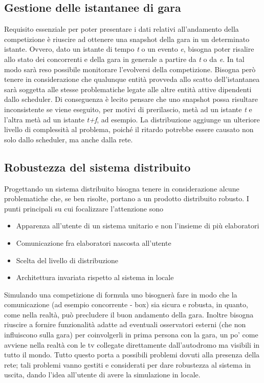 \subsection{Gestione delle istantanee di gara}
Requisito essenziale per poter presentare i dati relativi all'andamento della
competizione è riuscire ad ottenere una
snapshot della gara in un determinato istante. Ovvero, dato un istante di tempo
\emph{t} o un evento \emph{e}, bisogna
poter risalire allo stato dei concorrenti e della gara in generale a partire da \emph{t} o da \emph{e}. 
In tal modo sarà reso possibile
monitorare l'evolversi della competizione. Bisogna però tenere in considerazione
che qualunque entità provveda allo scatto
dell'istantanea sarà soggetta alle stesse problematiche legate alle altre entità
attive dipendenti dallo scheduler. 
Di conseguenza è lecito pensare che uno snapshot possa risultare inconsistente
se viene eseguito, per motivi di 
prerilascio, metà ad un istante
\emph{t} e l'altra metà ad un istante \emph{t+f}, ad esempio. La distribuzione
aggiunge un ulteriore livello di complessità
al problema, poiché il ritardo potrebbe essere causato non solo dallo scheduler,
ma anche dalla rete.
\subsection{Robustezza del sistema distribuito }
Progettando un sistema distribuito bisogna tenere in considerazione alcune
problematiche che, se ben risolte, portano a un prodotto distribuito robusto.
I punti principali su cui focalizzare l'attenzione sono
\begin{itemize}
\item Apparenza all'utente di un sistema unitario e non l'insieme di pi\`{u}
elaboratori
\item Comunicazione fra elaboratori nascosta all'utente
\item Scelta del livello di distribuzione
\item Architettura invariata rispetto al sistema in locale
\end{itemize}
Simulando una competizione di formula uno bisognerà fare in modo che la comunicazione (ad esempio concorrente - box) sia sicura e robusta, in quanto, come nella realtà, può precludere il buon andamento della gara. Inoltre bisogna riuscire a fornire funzionalità adatte ad eventuali osservatori esterni (che non influiscono sulla gara) per coinvolgerli in prima persona con la gara, un po' come avviene nella realtà con le tv collegate direttamente dall'autodromo ma visibili in tutto il mondo. Tutto questo porta a possibili problemi dovuti alla presenza della rete; tali problemi vanno gestiti e considerati per dare robustezza al sistema in uscita, dando l'idea all'utente di avere la simulazione in locale.
